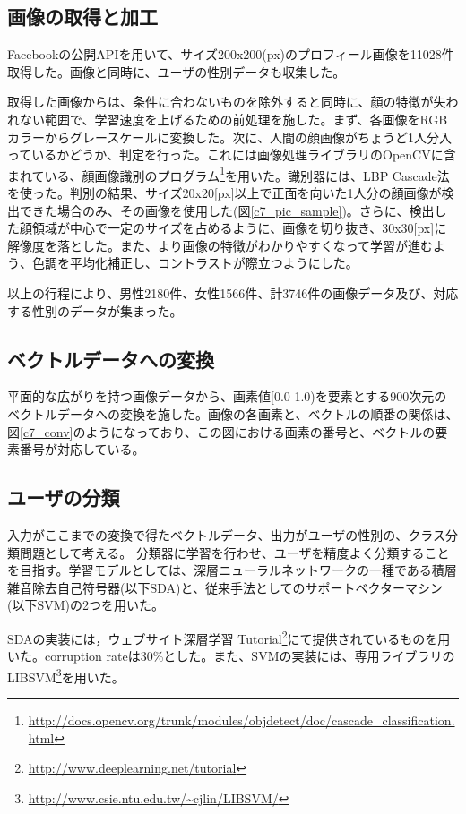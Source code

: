 \subsection{画像の取得と加工}
Facebookの公開APIを用いて、サイズ200x200(px)のプロフィール画像を11028件取得した。画像と同時に、ユーザの性別データも収集した。\par
取得した画像からは、条件に合わないものを除外すると同時に、顔の特徴が失われない範囲で、学習速度を上げるための前処理を施した。まず、各画像をRGBカラーからグレースケールに変換した。次に、人間の顔画像がちょうど1人分入っているかどうか、判定を行った。これには画像処理ライブラリのOpenCVに含まれている、顔画像識別のプログラム\footnote{\url{http://docs.opencv.org/trunk/modules/objdetect/doc/cascade_classification.html}}を用いた。識別器には、LBP Cascade法\cite{liao2007learning}を使った。判別の結果、サイズ20x20[px]以上で正面を向いた1人分の顔画像が検出できた場合のみ、その画像を使用した(図\ref{c7_pic_sample})。さらに、検出した顔領域が中心で一定のサイズを占めるように、画像を切り抜き、30x30[px]に解像度を落とした。また、より画像の特徴がわかりやすくなって学習が進むよう、色調を平均化補正し、コントラストが際立つようにした。\par
以上の行程により、男性2180件、女性1566件、計3746件の画像データ及び、対応する性別のデータが集まった。
\subsection{ベクトルデータへの変換}
平面的な広がりを持つ画像データから、画素値[0.0-1.0)を要素とする900次元のベクトルデータへの変換を施した。画像の各画素と、ベクトルの順番の関係は、図\ref{c7_conv}のようになっており、この図における画素の番号と、ベクトルの要素番号が対応している。
\subsection{ユーザの分類}
入力がここまでの変換で得たベクトルデータ、出力がユーザの性別の、クラス分類問題として考える。
分類器に学習を行わせ、ユーザを精度よく分類することを目指す。学習モデルとしては、深層ニューラルネットワークの一種である積層雑音除去自己符号器(以下SDA)と、従来手法としてのサポートベクターマシン(以下SVM)の2つを用いた。\par
SDAの実装には，ウェブサイト深層学習 Tutorial\footnote{\url{http://www.deeplearning.net/tutorial}}にて提供されているものを用いた。corruption rateは30\%とした。また、SVMの実装には、専用ライブラリのLIBSVM\footnote{\url{http://www.csie.ntu.edu.tw/~cjlin/LIBSVM/}}を用いた。
\par

